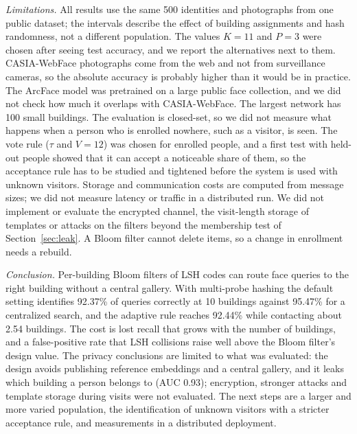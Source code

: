 \documentclass[runningheads]{llncs}
\begin{document}
\emph{Limitations.} All results use the same 500 identities and photographs from one public dataset; the intervals
describe the effect of building assignments and hash randomness, not a different population. The values $K=11$ and
$P=3$ were chosen after seeing test accuracy, and we report the alternatives next to them. CASIA-WebFace photographs
come from the web and not from surveillance cameras, so the absolute accuracy is probably higher than it would be in
practice. The ArcFace model was pretrained on a large public face collection, and we did not check how much it overlaps
with CASIA-WebFace. The largest network has 100 small buildings. The evaluation is closed-set, so we did not measure
what happens when a person who is enrolled nowhere, such as a visitor, is seen. The vote rule ($\tau$ and $V=12$) was
chosen for enrolled people, and a first test with held-out people showed that it can accept a noticeable share of
them, so the acceptance rule has to be studied and tightened before the system is used with unknown visitors. Storage
and communication costs are computed from message sizes; we did not measure latency or traffic in a distributed run.
We did not implement or evaluate the encrypted channel, the visit-length storage of templates or attacks on the
filters beyond the membership test of Section~\ref{sec:leak}. A Bloom filter cannot delete items, so a change in
enrollment needs a rebuild.

\emph{Conclusion.} Per-building Bloom filters of LSH codes can route face queries to the right building without a
central gallery. With multi-probe hashing the default setting identifies 92.37\% of queries correctly at 10
buildings against 95.47\% for a centralized search, and the adaptive rule reaches 92.44\% while contacting
about 2.54 buildings. The cost is lost recall that grows with the number of buildings, and a false-positive
rate that LSH collisions raise well above the Bloom filter's design value. The privacy conclusions are limited to what
was evaluated: the design avoids publishing reference embeddings and a central gallery, and it leaks which building a
person belongs to (AUC 0.93); encryption, stronger attacks and template storage during visits were not
evaluated. The next steps are a larger and more varied population, the identification of unknown visitors with a
stricter acceptance rule, and measurements in a distributed deployment.
\end{document}
